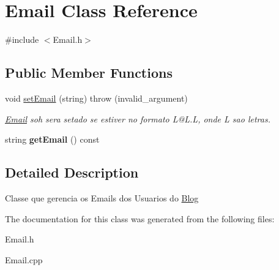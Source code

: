\hypertarget{classEmail}{}\section{Email Class Reference}
\label{classEmail}


{\ttfamily \#include $<$Email.\+h$>$}

\subsection*{Public Member Functions}
\begin{DoxyCompactItemize}
\item 
void \hyperlink{classEmail_a47fc9d4d76a2e2a7bc502f16c1d034be}{set\+Email} (string)  throw (invalid\+\_\+argument)\hypertarget{classEmail_a47fc9d4d76a2e2a7bc502f16c1d034be}{}\label{classEmail_a47fc9d4d76a2e2a7bc502f16c1d034be}

\begin{DoxyCompactList}\small\item\em \hyperlink{classEmail}{Email} soh sera setado se estiver no formato L@L.\+L, onde L sao letras. \end{DoxyCompactList}\item 
string {\bfseries get\+Email} () const \hypertarget{classEmail_aa2898fe9d48e9bf02b32b63fb18b63b9}{}\label{classEmail_aa2898fe9d48e9bf02b32b63fb18b63b9}

\end{DoxyCompactItemize}


\subsection{Detailed Description}
Classe que gerencia os Emails dos Usuarios do \hyperlink{classBlog}{Blog} 

The documentation for this class was generated from the following files\+:\begin{DoxyCompactItemize}
\item 
Email.\+h\item 
Email.\+cpp\end{DoxyCompactItemize}
